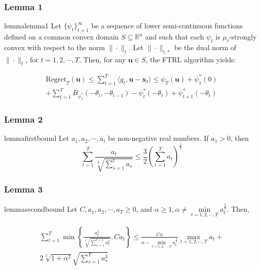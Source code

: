 \documentclass{beamer}
\newcommand{\R}{\mathbb{R}}
\newcommand{\Regret}{\text{Regret}}
\newcommand{\bx}{\mathbf{x}}
\newcommand{\bu}{\mathbf{u}}
\begin{document}
\begin{frame}
  \frametitle{Lemma 1}
  \begin{restatable}{lemma}{lemma1}\label{lemma:1}
    Let $\{\psi_t\}_{t=1}^\infty$ be a sequence of lower semi-continuous functions defined on a common convex domain $S
    \subseteq \R^n$ and such that each $\psi_t$ is $\mu_t$-strongly convex with respect to the norm $\|\cdot\|_t$. Let
    $\|\cdot\|_{t, *}$ be the dual norm of $\| \cdot \|_t$, for $t = 1, 2, \cdots, T$. Then, for any $\bu \in S$, the
    FTRL algorithm yields:

    \begin{align*}
      \Regret _T (\bu) \leq \sum\limits_{t=1}^T \langle g_t, \bu - \bx_t \rangle \leq \psi_{T}(\bu) + \psi_{1}^* (0) \\
      + \sum\limits_{t=1}^T B_{\psi_{t}^*}(-\theta_t, -\theta_{t-1}) - \psi_{t}^* (-\theta_t) + \psi_{t+1}^*(-\theta_t)
    \end{align*}
  \end{restatable}
\end{frame}

\begin{frame}
  \frametitle{Lemma 2}
  \begin{restatable}{lemma}{firstbound}\label{lemma:2}
    Let $a_1, a_2, \cdots, a_t$ be non-negative real numbers. If $a_1 > 0$, then
    \[
      \sum\limits_{t=1}^T \frac{a_t}{\sqrt[3]{\sum\limits_{s=1}^t a_s}} \leq \frac{3}{2}\left(\sum\limits_{t=1}^T
      a_t\right)^\frac{2}{3}
    \]
  \end{restatable}
\end{frame}

\begin{frame}
  \frametitle{Lemma 3}
  \begin{restatable}{lemma}{secondbound}\label{lemma:3}
    Let $C, a_1, a_2, \cdots, a_T \geq 0$, and $\alpha \geq 1, \alpha \neq \min\limits_{t=1,2,\cdots,T}a_{t}^\frac{4}{3}$.
    Then,

    \begin{align*}
      \sum\limits_{t=1}^T \min \left\{ \frac{a_{t}^2}{\sqrt[3]{\sum\limits_{s=1}^{t-1} a_{s}^2}}, C a_t\right\} \leq
      \frac{C \alpha}{\alpha - \min\limits_{t=1,2,\cdots,T}a_{t}^\frac{4}{3}} \max\limits_{t=1,2,\cdots,T} a_t
      + \\ 2\sqrt[3]{1 + \alpha^2} \sqrt{\sum\limits_{s=1}^T a_{s}^3}
    \end{align*}
  \end{restatable}
\end{frame}
\end{document}
